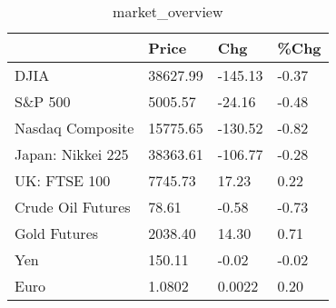 \documentclass{article}%
\begin{document}
%


\begin{table}[htbp]%
\caption{market\_overview}%
\centering%
\begin{adjustbox}{width=1\textwidth}%
\begin{tabular}{llll}
\toprule
                  &    Price &     Chg &  \%Chg \\
\midrule
             DJIA & 38627.99 & -145.13 & -0.37 \\
          S\&P 500 &  5005.57 &  -24.16 & -0.48 \\
 Nasdaq Composite & 15775.65 & -130.52 & -0.82 \\
Japan: Nikkei 225 & 38363.61 & -106.77 & -0.28 \\
     UK: FTSE 100 &  7745.73 &   17.23 &  0.22 \\
Crude Oil Futures &    78.61 &   -0.58 & -0.73 \\
     Gold Futures &  2038.40 &   14.30 &  0.71 \\
              Yen &   150.11 &   -0.02 & -0.02 \\
             Euro &   1.0802 &  0.0022 &  0.20 \\
\bottomrule
\end{tabular}
%
\end{adjustbox}%
\end{table}

%
\end{document}
